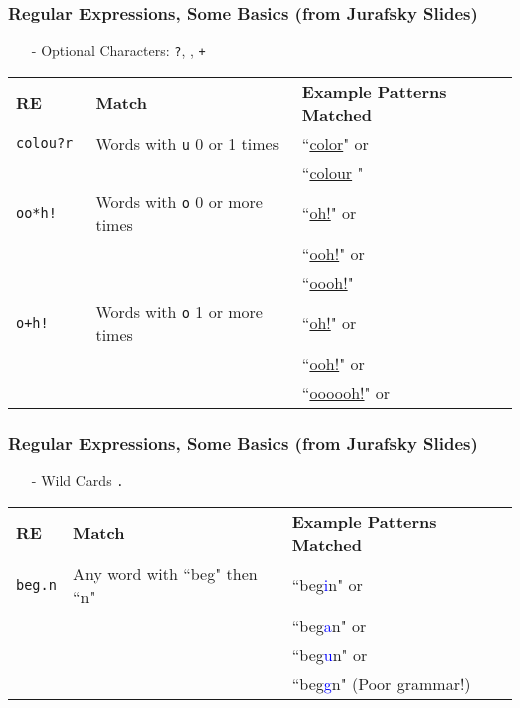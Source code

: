 \documentclass{beamer}
\numberwithin{equation}{section}
\begin{document}
\begin{frame}
\frametitle{Regular Expressions, Some Basics (from Jurafsky Slides) } 
\begin{itemize}
\item[-] Optional Characters: {\tt ?}, {\tt *}, {\tt +} 
\end{itemize}
\begin{center}
\begin{tabular}{lll}
\textbf{RE} & \textbf{Match} & \textbf{Example Patterns Matched}\\
{\tt colou?r } &  Words with {\tt u}  0 or 1 times& ``\underline{color}"  or \\
                   &                                & ``\underline{colour} " \\
{\tt oo*h!}     & Words with {\tt o}  0 or more times & ``\underline{oh!}" or \\
                      &                                                   &   ``\underline{ooh!}" or \\
                       &                                                   &   ``\underline{oooh!}" \\ 
{\tt o+h!} &   Words with {\tt o} 1 or more times & ``\underline{oh!}" or \\
  &                                                   &   ``\underline{ooh!}" or \\
    &                                                   &   ``\underline{oooooh!}" or \\                       
\end{tabular}
\end{center}
\end{frame}

\begin{frame}
\frametitle{Regular Expressions, Some Basics (from Jurafsky Slides) } 
\begin{itemize}
\item[-] Wild Cards \alert{{\tt .} } 
\end{itemize}
\begin{center}
\begin{tabular}{lll}
\textbf{RE} & \textbf{Match} & \textbf{Example Patterns Matched}\\
{\tt beg\alert{.}n} & Any word with ``beg" then ``n" & ``beg\textcolor{blue}{i}n" or \\
                          &                                            &  ``beg\textcolor{blue}{a}n" or \\
                          &                                            &  ``beg\textcolor{blue}{u}n" or \\
                          &                                            &  ``beg\textcolor{blue}{g}n" (Poor grammar!) 
                          
 \end{tabular}
 \end{center}
 
 \end{frame}
\end{document}
